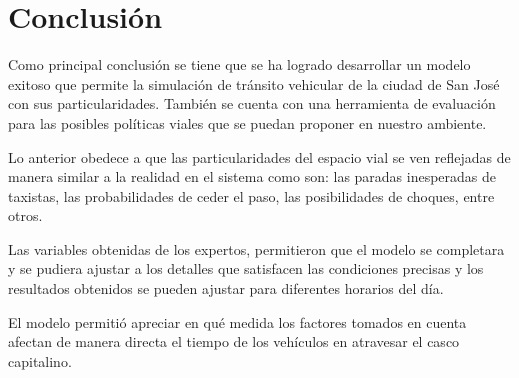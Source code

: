 \documentclass[conference]{IEEEtran}
\begin{document}
\section{Conclusi\'on}
Como principal conclusi\'on se tiene que se ha logrado desarrollar un modelo exitoso que permite la simulaci\'on de tr\'ansito vehicular de la ciudad de San Jos\'e con sus particularidades. Tambi\'en se cuenta con una herramienta de evaluaci\'on para las posibles pol\'iticas viales que se puedan proponer en nuestro ambiente. 


Lo anterior obedece a que las particularidades del espacio vial se ven reflejadas de manera similar a la realidad en el sistema como son: las paradas inesperadas de taxistas, las probabilidades de ceder el paso, las posibilidades de choques, entre otros.


Las variables obtenidas de los expertos, permitieron que el modelo se completara y se pudiera ajustar a los detalles que satisfacen las condiciones precisas y los resultados obtenidos se pueden ajustar para diferentes horarios del d\'ia.


El modelo permiti\'o apreciar en qu\'e medida los factores tomados en cuenta afectan de manera directa el tiempo de los veh\'iculos en atravesar el casco capitalino.



%
\end{document}
